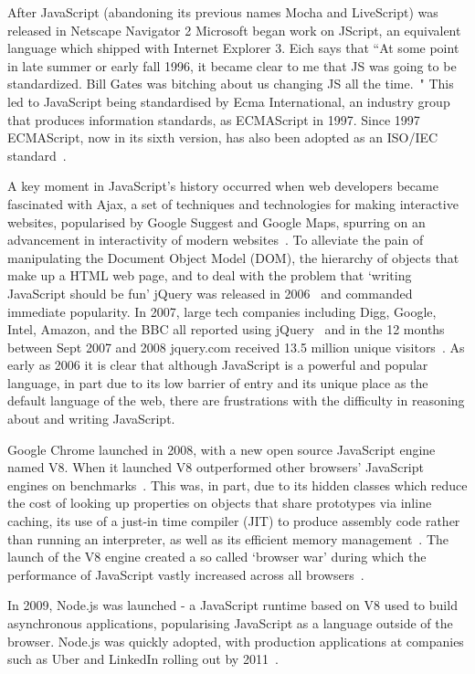 \documentclass[]{final_report}
\begin{document}
After JavaScript (abandoning its previous names Mocha and LiveScript) was released in Netscape Navigator 2 Microsoft began work on JScript, an equivalent language which shipped with Internet Explorer 3. Eich says that ``At some point in late summer or early fall 1996, it became clear to me that JS was going to be standardized. Bill Gates was bitching about us changing JS all the time.~\cite{newjavascriptmoduleowner}" This led to JavaScript being standardised by Ecma International, an industry group that produces information standards, as ECMAScript in 1997. Since 1997 ECMAScript, now in its sixth version, has also been adopted as an ISO/IEC standard~\cite{ISO/IEC16262:2011}.

A key moment in JavaScript's history occurred when web developers became fascinated with Ajax, a set of techniques and technologies for making interactive websites, popularised by Google Suggest and Google Maps, spurring on an advancement in interactivity of modern websites~\cite{ajax}. To alleviate the pain of manipulating the Document Object Model (DOM), the hierarchy of objects that make up a HTML web page, and to deal with the problem that `writing JavaScript should be fun' jQuery was released in 2006~\cite{historyofjquery} and commanded immediate popularity. In 2007, large tech companies including Digg, Google, Intel, Amazon, and the BBC all reported using jQuery~\cite{historyofjquery} and in the 12 months between Sept 2007 and 2008 jquery.com received 13.5 million unique visitors~\cite{stateofjquery}. As early as 2006 it is clear that although JavaScript is a powerful and popular language, in part due to its low barrier of entry and its unique place as the default language of the web, there are frustrations with the difficulty in reasoning about and writing JavaScript.

Google Chrome launched in 2008, with a new open source JavaScript engine named V8. When it launched V8 outperformed other browsers' JavaScript engines on benchmarks~\cite{chromebenchmarks}. This was, in part, due to its hidden classes which reduce the cost of looking up properties on objects that share prototypes via inline caching, its use of a just-in time compiler (JIT) to produce assembly code rather than running an interpreter, as well as its efficient memory management~\cite{chromeengine, chromeengine2}. The launch of the V8 engine created a so called `browser war' during which the performance of JavaScript vastly increased across all browsers~\cite{knowyourenginesmozilla}.

In 2009, Node.js was launched - a JavaScript runtime based on V8 used to build asynchronous applications, popularising JavaScript as a language outside of the browser. Node.js was quickly adopted, with production applications at companies such as Uber and LinkedIn rolling out by 2011~\cite{linkedinusesnode, uberusesnode}. 
\end{document}
